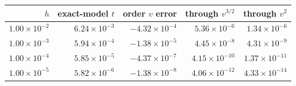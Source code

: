 \begin{tabular}{@{}rrrrr@{}}
\toprule
$h$ & exact-model $t$ & order $v$ error & through $v^{3/2}$ & through $v^2$ \\
\midrule
$1.00\mathbin{\times}10^{-2}$ & $6.24\mathbin{\times}10^{-3}$ & $-4.32\mathbin{\times}10^{-4}$ & $5.36\mathbin{\times}10^{-6}$ & $1.34\mathbin{\times}10^{-6}$ \\
$1.00\mathbin{\times}10^{-3}$ & $5.94\mathbin{\times}10^{-4}$ & $-1.38\mathbin{\times}10^{-5}$ & $4.45\mathbin{\times}10^{-8}$ & $4.31\mathbin{\times}10^{-9}$ \\
$1.00\mathbin{\times}10^{-4}$ & $5.85\mathbin{\times}10^{-5}$ & $-4.37\mathbin{\times}10^{-7}$ & $4.15\mathbin{\times}10^{-10}$ & $1.37\mathbin{\times}10^{-11}$ \\
$1.00\mathbin{\times}10^{-5}$ & $5.82\mathbin{\times}10^{-6}$ & $-1.38\mathbin{\times}10^{-8}$ & $4.06\mathbin{\times}10^{-12}$ & $4.33\mathbin{\times}10^{-14}$ \\
\bottomrule
\end{tabular}
